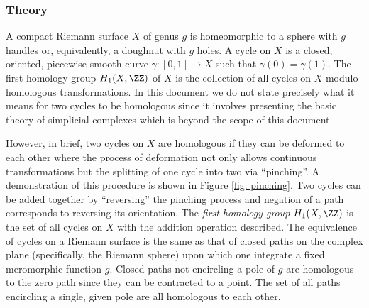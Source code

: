 %
\subsubsection*{Theory}
%

A compact Riemann surface $X$ of genus $g$ is homeomorphic to a sphere
with $g$ handles or, equivalently, a doughnut with $g$ holes. A cycle on
$X$ is a closed, oriented, piecewise smooth curve $\gamma : [0,1] \to X$
such that $\gamma(0) = \gamma(1)$. The first homology group $H_1(X,\ZZ)$
of $X$ is the collection of all cycles on $X$ modulo homologous
transformations. In this document we do not state precisely what it
means for two cycles to be homologous since it involves presenting the
basic theory of simplicial complexes which is beyond the scope of this
document.

However, in brief, two cycles on $X$ are homologous if they can be
deformed to each other where the process of deformation not only allows
continuous transformations but the splitting of one cycle into two via
``pinching''. A demonstration of this procedure is shown in Figure
\ref{fig: pinching}. Two cycles can be added together by ``reversing''
the pinching process and negation of a path corresponds to reversing its
orientation. The {\it first homology group} $H_1(X,\ZZ)$ is the set of
all cycles on $X$ with the addition operation described. The equivalence
of cycles on a Riemann surface is the same as that of closed paths on
the complex plane (specifically, the Riemann sphere) upon which one
integrate a fixed meromorphic function $g$. Closed paths not encircling
a pole of $g$ are homologous to the zero path since they can be
contracted to a point. The set of all paths encircling a single, given
pole are all homologous to each other.


